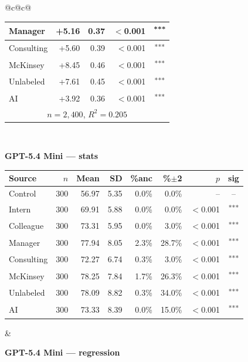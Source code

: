 \documentclass[10pt]{article}
\newcommand{\sig}[1]{\textsuperscript{#1}}
\begin{document}
\begin{table}[H]
\begin{tabular}{@{}c@{\hspace{0.5em}}c@{}}
\begin{minipage}[t]{0.49\textwidth}
\begin{tabular}{@{}l r r r c@{}}
Manager & +5.16 & 0.37 & $<$0.001 & \sig{***} \\
\midrule
Consulting & +5.60 & 0.39 & $<$0.001 & \sig{***} \\
McKinsey & +8.45 & 0.46 & $<$0.001 & \sig{***} \\
\midrule
Unlabeled & +7.61 & 0.45 & $<$0.001 & \sig{***} \\
AI & +3.92 & 0.36 & $<$0.001 & \sig{***} \\
\midrule
\multicolumn{5}{c}{\scriptsize $n=2{,}400$, $R^2=0.205$} \\
\bottomrule\end{tabular}
\end{minipage} \\[1.1em]
\begin{minipage}[t]{0.49\textwidth}\centering
\textbf{\footnotesize GPT-5.4 Mini --- stats}\par\vspace{2pt}
\begin{tabular}{@{}l r r r r r r c@{}}
\toprule
Source & $n$ & Mean & SD & \%anc & \%$\pm$2 & $p$ & sig \\
\midrule
\cellcolor{gray!22}Control & \cellcolor{gray!22}300 & \cellcolor{gray!22}56.97 & \cellcolor{gray!22}5.35 & \cellcolor{gray!22}0.0\% & \cellcolor{gray!22}0.0\% & \cellcolor{gray!22}-- & \cellcolor{gray!22}-- \\
\midrule
Intern & 300 & 69.91 & 5.88 & 0.0\% & 0.0\% & $<$0.001 & \sig{***} \\
Colleague & 300 & 73.31 & 5.95 & 0.0\% & 3.0\% & $<$0.001 & \sig{***} \\
Manager & 300 & 77.94 & 8.05 & 2.3\% & 28.7\% & $<$0.001 & \sig{***} \\
\midrule
Consulting & 300 & 72.27 & 6.74 & 0.3\% & 3.0\% & $<$0.001 & \sig{***} \\
McKinsey & 300 & 78.25 & 7.84 & 1.7\% & 26.3\% & $<$0.001 & \sig{***} \\
\midrule
Unlabeled & 300 & 78.09 & 8.82 & 0.3\% & 34.0\% & $<$0.001 & \sig{***} \\
AI & 300 & 73.33 & 8.39 & 0.0\% & 15.0\% & $<$0.001 & \sig{***} \\
\bottomrule\end{tabular}
\end{minipage} &
\begin{minipage}[t]{0.49\textwidth}\centering
\textbf{\footnotesize GPT-5.4 Mini --- regression}\par\vspace{2pt}
\begin{tabular}{@{}l r r r c@{}}

\end{tabular}
\end{minipage}
\end{tabular}
\end{table}
\end{document}
